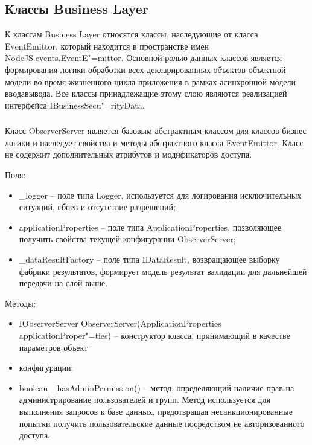 \subsection{Классы Business Layer}
\label{sub:arch_and_mod:probab_net}

К классам Business Layer относятся классы, наследующие от класса EventEmittor, который находится в пространстве имен NodeJS.events.EventE"=mittor. Основной ролью данных классов является формирования логики обработки всех декларированных объектов объектной модели во время жизненного цикла приложения в рамках асинхронной модели ввода\/вывода. Все классы принадлежащие этому слою являются реализацией интерфейса IBusinessSecu"=rityData.

\subsubsection{}
\label{sub:arch_and_mod:probab_net:observer}

Класс ObserverServer является базовым абстрактным классом для классов бизнес логики и наследует свойства и методы абстрактного класса EventEmittor. Класс не содержит дополнительных атрибутов и модификаторов доступа.

Поля:
\begin{itemize}
  \item \_logger – поле типа Logger, используется для логирования исключительных ситуаций, сбоев и отсутствие разрешений;
  \item applicationProperties – поле типа ApplicationProperties, позволяющее получить свойства текущей конфигурации ObserverServer;
  \item \_dataResultFactory – поле типа IDataResult, возвращающее выборку фабрики результатов, формирует модель результат валидации для дальнейшей передачи на слой выше.
\end{itemize}

Методы:
\begin{itemize}
  \item IObserverServer ObserverServer(ApplicationProperties applicationProper"=ties) – конструктор класса, принимающий в качестве параметров объект
  \item конфигурации;
  \item boolean \_hasAdminPermission() – метод, определяющий наличие прав на администрирование пользователей и групп. Метод используется для выполнения запросов к базе данных, предотвращая несанкционированные попытки получить пользовательские данные посредством не авторизованного доступа.
\end{itemize}

